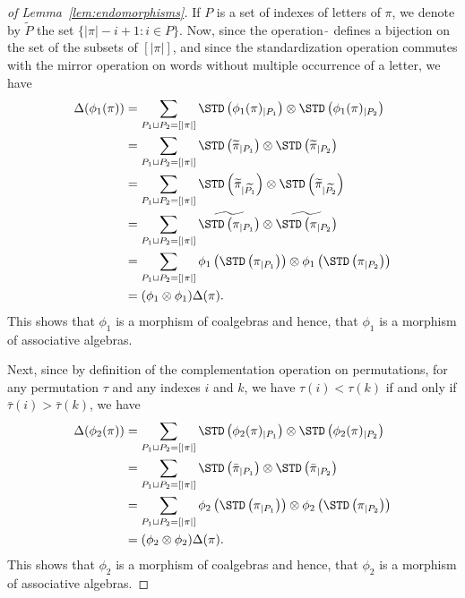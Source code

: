 \begin{proof}[of Lemma~\ref{lem:endomorphisms}]
    If $P$ is a set of indexes of letters of $\pi$, we denote by
    $\widetilde{P}$ the set $\{|\pi| - i  + 1 : i \in P\}$. Now, since
    the operation $\widetilde{\,}$ defines a bijection on the set of the
    subsets of $[|\pi|]$, and since the standardization operation
    commutes with the mirror operation on words without multiple
    occurrence of a letter, we have
    \begin{equation} \begin{split}
        \Delta(\phi_1(\pi))
        & = \sum_{P_1 \sqcup P_2 = [|\pi|]}
        \STD\left(\phi_1(\pi)_{|P_1}\right)
        \otimes \STD\left(\phi_1(\pi)_{|P_2}\right) \\
        & = \sum_{P_1 \sqcup P_2 = [|\pi|]}
        \STD\left(\widetilde{\pi}_{|P_1}\right)
        \otimes \STD\left(\widetilde{\pi}_{|P_2}\right) \\
        & = \sum_{P_1 \sqcup P_2 = [|\pi|]}
        \STD\left(\widetilde{\pi}_{|\widetilde{P_1}}\right)
        \otimes \STD\left(\widetilde{\pi}_{|\widetilde{P_2}}\right) \\
        & = \sum_{P_1 \sqcup P_2 = [|\pi|]}
        \widetilde{\STD\left(\pi_{|P_1}\right)}
        \otimes \widetilde{\STD\left(\pi_{|P_2}\right)} \\
        & = \sum_{P_1 \sqcup P_2 = [|\pi|]}
        \phi_1\left(\STD\left(\pi_{|P_1}\right)\right)
        \otimes \phi_1\left(\STD\left(\pi_{|P_2}\right)\right) \\
        & = (\phi_1 \otimes \phi_1) \Delta(\pi).
    \end{split} \end{equation}
    This shows that $\phi_1$ is a morphism of coalgebras and hence, that
    $\phi_1$ is a morphism of associative algebras.
    \smallskip

    Next, since by definition of the complementation operation on
    permutations, for any permutation $\tau$ and any indexes $i$ and $k$,
    we have $\tau(i) < \tau(k)$ if and only if $\bar \tau(i) > \bar \tau(k)$,
    we have
    \begin{equation} \begin{split}
        \Delta(\phi_2(\pi))
        & = \sum_{P_1 \sqcup P_2 = [|\pi|]}
        \STD\left(\phi_2(\pi)_{|P_1}\right)
        \otimes \STD\left(\phi_2(\pi)_{|P_2}\right) \\
        & = \sum_{P_1 \sqcup P_2 = [|\pi|]}
        \STD\left(\bar \pi_{|P_1}\right)
        \otimes \STD\left(\bar \pi_{|P_2}\right) \\
        & = \sum_{P_1 \sqcup P_2 = [|\pi|]}
        \phi_2\left(\STD\left(\pi_{|P_1}\right)\right)
        \otimes \phi_2\left(\STD\left(\pi_{|P_2}\right)\right) \\
        & = (\phi_2 \otimes \phi_2) \Delta(\pi).
    \end{split} \end{equation}
    This shows that $\phi_2$ is a morphism of coalgebras and hence, that
    $\phi_2$ is a morphism of associative algebras.
    \smallskip


\end{proof}
